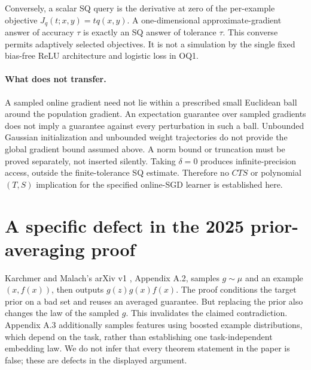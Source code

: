 \documentclass[11pt]{article}
\newcommand{\1}{\mathbf 1}
\begin{document}
Conversely, a scalar SQ query is the derivative at zero of the per-example objective $J_q(t;x,y)=tq(x,y)$. A one-dimensional approximate-gradient answer of accuracy $\tau$ is exactly an SQ answer of tolerance $\tau$. This converse permits adaptively selected objectives. It is not a simulation by the single fixed bias-free ReLU architecture and logistic loss in OQ1.

\paragraph{What does not transfer.}
A sampled online gradient need not lie within a prescribed small Euclidean ball around the population gradient. An expectation guarantee over sampled gradients does not imply a guarantee against every perturbation in such a ball. Unbounded Gaussian initialization and unbounded weight trajectories do not provide the global gradient bound assumed above. A norm bound or truncation must be proved separately, not inserted silently. Taking $\delta=0$ produces infinite-precision access, outside the finite-tolerance SQ estimate. Therefore no $CTS$ or polynomial $(T,S)$ implication for the specified online-SGD learner is established here.

\section{A specific defect in the 2025 prior-averaging proof}
Karchmer and Malach's arXiv v1 \citep{KM25}, Appendix A.2, samples $g\sim\mu$ and an example $(x,f(x))$, then outputs $g(z)g(x)f(x)$. The proof conditions the target prior on a bad set and reuses an averaged guarantee. But replacing the prior also changes the law of the sampled $g$. This invalidates the claimed contradiction. Appendix A.3 additionally samples features using boosted example distributions, which depend on the task, rather than establishing one task-independent embedding law. We do not infer that every theorem statement in the paper is false; these are defects in the displayed argument.
\end{document}
